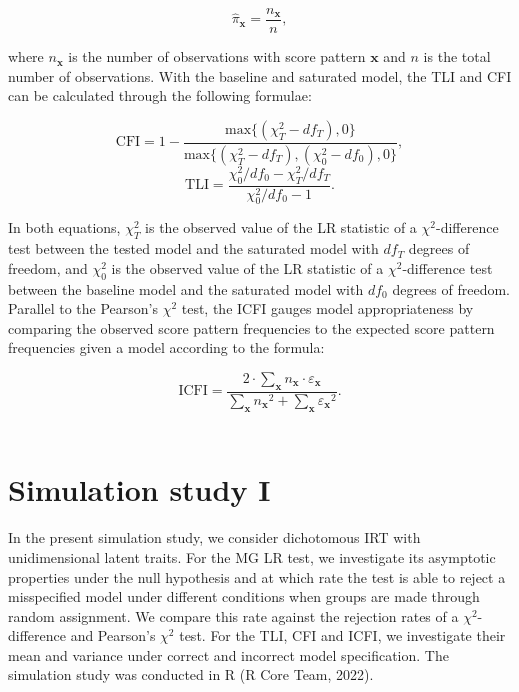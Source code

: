 \documentclass[Royal,sageapa,times,doublespace]{sagej}
\begin{document}
\begin{equation*}
\hat{\pi}_{\boldsymbol{x}} = \frac{n_{\boldsymbol{x}}}{n},
\end{equation*}

where $n_{\boldsymbol{x}}$ is the number of observations with score pattern $\boldsymbol{x}$ and $n$ is the total number of observations. With the baseline and saturated model, the TLI and CFI can be calculated through the following formulae:

\begin{equation}
\text{CFI} = 1 - \frac{\text{max}\{(\chi^2_T - df_T), 0\}}{\text{max}\{(\chi^2_T - df_T), (\chi^2_0 - df_0), 0\}},
\end{equation}
\begin{equation}
\text{TLI} = \frac{\chi^2_0/df_0 - \chi^2_T/df_T}{\chi^2_0/df_0 - 1}.
\end{equation}

In both equations, $\chi^{2}_{T}$ is the observed value of the LR statistic of a $\chi^2$-difference test between the tested model and the saturated model with $df_T$ degrees of freedom, and $\chi^{2}_{0}$ is the observed value of the LR statistic of a $\chi^2$-difference test between the baseline model and the saturated model with $df_0$ degrees of freedom. \\
\indent Parallel to the Pearson's $\chi^2$ test, the ICFI gauges model appropriateness by comparing the observed score pattern frequencies to the expected score pattern frequencies given a model according to the formula:

\begin{equation}
\text{ICFI} = \frac{2 \cdot \sum_{\boldsymbol{x}}  n_{\boldsymbol{x}} \cdot \varepsilon_{\boldsymbol{x}}  }{  \sum_{\boldsymbol{x}}  {n_{\boldsymbol{x}}}^2 +  \sum_{\boldsymbol{x}}  {\varepsilon_{\boldsymbol{x}}} ^2 }.
\end{equation} \\

\section{\centering Simulation study I}
In the present simulation study, we consider dichotomous IRT with unidimensional latent traits. For the MG LR test, we investigate its asymptotic properties under the null hypothesis and at which rate the test is able to reject a misspecified model under different conditions when groups are made through random assignment. We compare this rate against the rejection rates of a $\chi^2$-difference and Pearson's $\chi^2$ test. For the TLI, CFI and ICFI, we investigate their mean and variance under correct and incorrect model specification. The simulation study was conducted in R (R Core Team, 2022).
\end{document}
